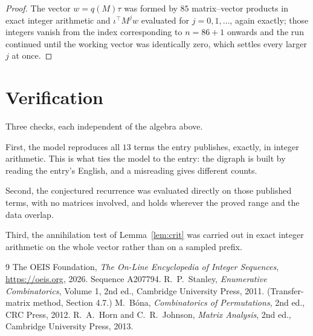 \documentclass[11pt,a4paper]{article}
\theoremstyle{plain}
\theoremstyle{definition}
\begin{document}
\begin{proof}
The vector $w=q(M)\tau$ was formed by $85$ matrix--vector products in exact integer
arithmetic and $\iota^{\!\top}M^{j}w$ evaluated for $j=0,1,\dots$, again exactly; those
integers vanish from the index corresponding to $n=86+1$ onwards and the run continued
until the working vector was identically zero, which settles every larger $j$ at once.
\end{proof}

\section{Verification}

Three checks, each independent of the algebra above.

First, the model reproduces all $13$ terms the entry publishes, exactly, in integer
arithmetic. This is what ties the model to the entry: the digraph is built by reading the
entry's English, and a misreading gives different counts.

Second, the conjectured recurrence was evaluated directly on those published terms, with no
matrices involved, and holds wherever the proved range and the data overlap.

Third, the annihilation test of Lemma~\ref{lem:crit} was carried out in exact integer
arithmetic on the whole vector rather than on a sampled prefix.

\begin{thebibliography}{9}
 The OEIS Foundation, \emph{The On-Line Encyclopedia of Integer
Sequences}, \url{https://oeis.org}, 2026. Sequence A207794.
 R.~P.~Stanley, \emph{Enumerative Combinatorics}, Volume 1, 2nd ed.,
Cambridge University Press, 2011. (Transfer-matrix method, Section 4.7.)
 M.~B\'ona, \emph{Combinatorics of Permutations}, 2nd ed., CRC
Press, 2012.
 R.~A.~Horn and C.~R.~Johnson, \emph{Matrix Analysis}, 2nd ed., Cambridge
University Press, 2013.
\end{thebibliography}
\end{document}
